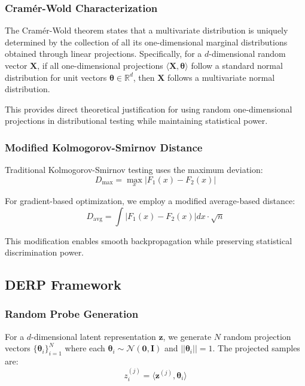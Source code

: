\documentclass{article}
\begin{document}
\subsubsection{Cramér-Wold Characterization}

The Cramér-Wold theorem states that a multivariate distribution is uniquely determined by the collection of all its one-dimensional marginal distributions obtained through linear projections. Specifically, for a $d$-dimensional random vector $\mathbf{X}$, if all one-dimensional projections $\langle \mathbf{X}, \boldsymbol{\theta} \rangle$ follow a standard normal distribution for unit vectors $\boldsymbol{\theta} \in \mathbb{R}^d$, then $\mathbf{X}$ follows a multivariate normal distribution.

This provides direct theoretical justification for using random one-dimensional projections in distributional testing while maintaining statistical power.

\subsubsection{Modified Kolmogorov-Smirnov Distance}

Traditional Kolmogorov-Smirnov testing uses the maximum deviation:
\begin{equation}
D_{\text{max}} = \max_x |F_1(x) - F_2(x)|
\end{equation}

For gradient-based optimization, we employ a modified average-based distance:
\begin{equation}
D_{\text{avg}} = \int |F_1(x) - F_2(x)| dx \cdot \sqrt{n}
\end{equation}

This modification enables smooth backpropagation while preserving statistical discrimination power.

\subsection{DERP Framework}

\subsubsection{Random Probe Generation}

For a $d$-dimensional latent representation $\mathbf{z}$, we generate $N$ random projection vectors $\{\boldsymbol{\theta}_i\}_{i=1}^N$ where each $\boldsymbol{\theta}_i \sim \mathcal{N}(\mathbf{0}, \mathbf{I})$ and $||\boldsymbol{\theta}_i|| = 1$. The projected samples are:
\begin{equation}
z_i^{(j)} = \langle \mathbf{z}^{(j)}, \boldsymbol{\theta}_i \rangle
\end{equation}
\end{document}
